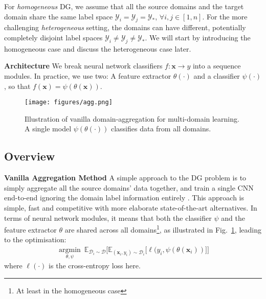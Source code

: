 \documentclass[10pt,twocolumn,letterpaper]{article}
\newcommand{\keypoint}[1]{\vspace{0.1cm}\noindent\textbf{#1}\quad}
\begin{document}
For \emph{homogeneous} DG, we assume that all the source domains and the target domain share the same label space $\mathcal{Y}_i=\mathcal{Y}_j=\mathcal{Y}_*$, $\forall i,j\in[1,n]$. For the more challenging \emph{heterogeneous} setting, the domains can have different, potentially completely disjoint label spaces $\mathcal{Y}_i\neq\mathcal{Y}_j\neq\mathcal{Y}_*$. We will start by introducing the homogeneous case and discuss the heterogeneous case later.

\keypoint{Architecture} We break neural network classifiers $f:\mathbf{x}\to y$ into a sequence modules. In practice, we use two: A feature extractor $\theta(\cdot)$ and a classifier $\psi(\cdot)$, so that $f(\mathbf{x})=\psi(\theta(\mathbf{x}))$.

\begin{figure}[t]
\centering
\texttt{[image: figures/agg.png]}
\vspace{-0.4cm}
\caption{\small Illustration of vanilla domain-aggregation for multi-domain learning. A single model $\psi(\theta(\cdot))$ classifies data from all domains.}
\label{fig-agg}
    \vspace{-0.3cm}
\end{figure}

\subsection{Overview}\label{sec:overview}
\keypoint{Vanilla Aggregation Method} 
A simple approach to the DG problem is to simply aggregate all the source domains' data together, and train a single CNN end-to-end ignoring the domain label information entirely \cite{Li2017dg}. This approach is simple, fast and competitive with more elaborate state-of-the-art alternatives. In terms of neural network modules, it means that both the classifier $\psi$ and the feature extractor $\theta$ are shared across all domains\footnote{At least in the homogeneous case}, as illustrated in Fig.~\ref{fig-agg}, leading to the optimisation:
\begin{equation}
\label{eq:agg}
\begin{aligned}
\underset{\theta, \psi}{\operatorname{argmin}}~ \mathbb{E}_{\mathcal{D}_i\sim\mathcal{D}} \big[ \mathbb{E}_{(\mathbf{x}_i,y_i)\sim \mathcal{D}_i} \big[  \ell(y_i, \psi (\theta(\mathbf{x}_i)) \big] \big]
\end{aligned}
\end{equation}
where $\ell(\cdot)$ is the cross-entropy loss here.
\end{document}
